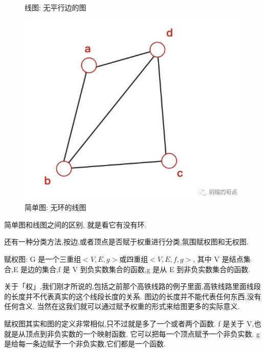 \begin{figure}[ht]
\begin{minipage}[t]{0.3\textwidth}
    \caption{线图: 无平行边的图}
    \label{fig:img25_10}
  \end{minipage}%
  \hspace{0.5em}
  \begin{minipage}[t]{0.3\textwidth}
    \includegraphics[width=\textwidth]{asset/20231227145259.png}
    \caption{简单图: 无环的线图}
    \label{fig:img25_11}
  \end{minipage}
\end{figure}

简单图和线图之间的区别, 就是看它有没有环. 

还有一种分类方法,按边,或者顶点是否赋于权重进行分类,氛围赋权图和无权图. 

赋权图: G 是一个三重组$<V,E,g>$或四重组$<V,E,f,g>$, 其中 V 是结点集合,E 是边的集合,f 是 V 到负实数集合的函数,g 是从 E 到非负实数集合的函数. 

关于「权」,我们刚才所说的,包括之前那个高铁线路的例子里面,高铁线路里面线段的长度并不代表真实的这个线段长度的关系. 图边的长度并不能代表任何东西,没有任何含义. 当然在这我们就可以通过赋予权重的形式来给图更多的实际意义. 

赋权图其实和图的定义非常相似,只不过就是多了一个或者两个函数. f 是关于 V,也就是从顶点到非负实数的一个映射函数. 它可以把每一个顶点赋予一个非负实数. g 是给每一条边赋予一个非负实数,它们都是一个函数. 

